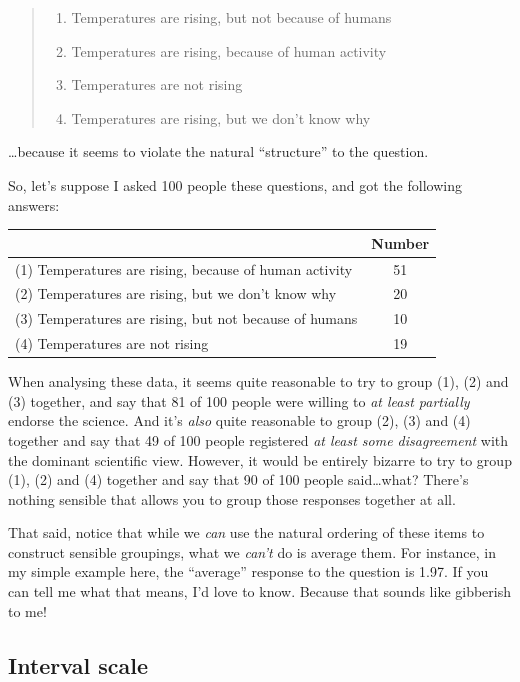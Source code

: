 \documentclass[
]{book}
\providecommand{\tightlist}{%
  \setlength{\itemsep}{0pt}\setlength{\parskip}{0pt}}
\begin{document}
\begin{quote}
\begin{enumerate}
\def\labelenumi{(\arabic{enumi})}
\setcounter{enumi}{2}
\tightlist
\item
  Temperatures are rising, but not because of humans\\
\item
  Temperatures are rising, because of human activity\\
\item
  Temperatures are not rising\\
\item
  Temperatures are rising, but we don't know why
\end{enumerate}
\end{quote}

\ldots because it seems to violate the natural ``structure'' to the question.

So, let's suppose I asked 100 people these questions, and got the following answers:

\begin{longtable}[]{@{}lc@{}}
\toprule
& Number\tabularnewline
\midrule
\endhead
(1) Temperatures are rising, because of human activity & 51\tabularnewline
(2) Temperatures are rising, but we don't know why & 20\tabularnewline
(3) Temperatures are rising, but not because of humans & 10\tabularnewline
(4) Temperatures are not rising & 19\tabularnewline
\bottomrule
\end{longtable}

When analysing these data, it seems quite reasonable to try to group (1), (2) and (3) together, and say that 81 of 100 people were willing to {\emph{at least partially}} endorse the science. And it's {\emph{also}} quite reasonable to group (2), (3) and (4) together and say that 49 of 100 people registered {\emph{at least some disagreement}} with the dominant scientific view. However, it would be entirely bizarre to try to group (1), (2) and (4) together and say that 90 of 100 people said\ldots what? There's nothing sensible that allows you to group those responses together at all.

That said, notice that while we {\emph{can}} use the natural ordering of these items to construct sensible groupings, what we {\emph{can't}} do is average them. For instance, in my simple example here, the ``average'' response to the question is 1.97. If you can tell me what that means, I'd love to know. Because that sounds like gibberish to me!

\hypertarget{interval-scale}{%
\subsection{Interval scale}\label{interval-scale}}
\end{document}
